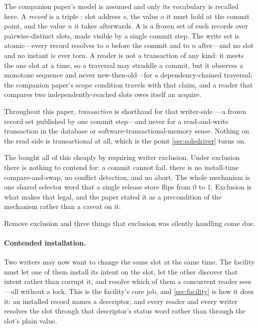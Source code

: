 \documentclass[11pt]{article}
\begin{document}
The companion paper's model is assumed and only its vocabulary is recalled here.
A \emph{record} is a triple : slot address $s$, the value $o$ it
must hold at the commit point, and the value $n$ it takes afterwards. A
\pseudotxn is a frozen set of such records over pairwise-distinct slots, made
visible by a single commit step. The write set is atomic---every record resolves
to $o$ before the commit and to $n$ after---and no slot and no instant is ever
torn. A reader is not a transaction of any kind: it meets the \pseudotxn one slot
at a time, so a traversal may straddle a commit, but it observes a monotone
sequence and never new-then-old---for a dependency-chained traversal; the
companion paper's scope condition travels with that claim, and a reader that
compares two independently-reached slots owes itself an acquire.

Throughout this paper, \emph{transaction} is shorthand for that writer-side
\pseudotxn---a frozen record set published by one commit step---and never for a
read-and-write transaction in the database or software-transactional-memory
sense. Nothing on the read
side is transactional at all, which is the point \cref{sec:soledriver} turns on.

The \fliplatch bought all of this cheaply by requiring writer exclusion. Under
exclusion there is nothing to contend for: a commit cannot fail, there is no
install-time compare-and-swap, no conflict detection, and no abort. The whole
mechanism is one shared selector word that a single release store flips from
$0$ to $1$. Exclusion is what makes that legal, and the paper stated it as a
precondition of the mechanism rather than a caveat on it.

Remove exclusion and three things that exclusion was silently handling come due.

\paragraph{Contended installation.} Two writers may now want to change the same
slot at the same time. The facility must let one of them install its intent on the
slot, let the other discover that intent rather than corrupt it, and resolve
which of them a concurrent reader sees---all without a lock. This is the facility's
core job, and \cref{sec:facility} is how it does it: an installed record names a
descriptor, and every reader and every writer resolves the slot through that
descriptor's status word rather than through the slot's plain value.
\end{document}
